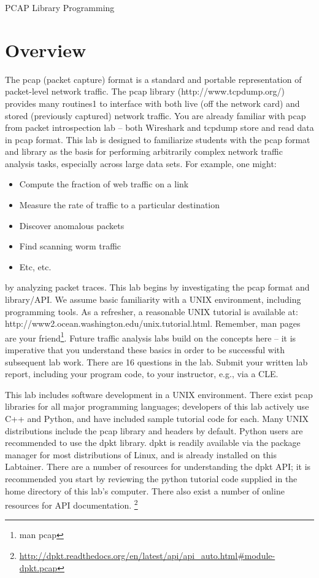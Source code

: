 


\begin{center}
{\LARGE PCAP Library Programming}
\vspace{0.1in}\\
\end{center}

\section{Overview}
The pcap (packet capture) format is a standard and portable representation of packet-level network traffic. The pcap library (http://www.tcpdump.org/) provides many routines1 to interface with both live (off the network card) and stored (previously captured) network traffic. You are already familiar with pcap from 
packet introspection lab – both Wireshark and tcpdump store and read data in pcap format.
This lab is designed to familiarize students with the pcap format and library as the basis for performing arbitrarily complex network traffic analysis tasks, especially across large data sets. For example, one might:
\begin{itemize}
\item Compute the fraction of web traffic on a link
\item Measure the rate of traffic to a particular destination 
\item Discover anomalous packets
\item Find scanning worm traffic
\item Etc, etc.
\end{itemize}
by analyzing packet traces. This lab begins by investigating the pcap format and library/API. We assume basic familiarity with a UNIX environment, including programming tools. As
a refresher, a reasonable UNIX tutorial is available at: http://www2.ocean.washington.edu/unix.tutorial.html.
Remember, man pages are your friend\footnote{man pcap}. Future traffic analysis labs build on the concepts here – it is imperative that you understand these basics in order to be successful with subsequent lab work.
There are 16 questions in the lab. Submit your written lab report, including your program code, to your instructor, e.g., via a CLE.
  
This lab includes software development in a UNIX environment.  There exist pcap libraries for all major programming languages; developers of this lab actively use C++ and Python, and have included sample tutorial code for each. Many UNIX distributions include the pcap library and headers by default. Python users are recommended to use the dpkt library. dpkt is readily available via the package manager for most distributions of Linux, and is already installed on this Labtainer. There are a number of resources for understanding the dpkt API; it is recommended you start by reviewing the python tutorial code supplied in the home directory of this lab's computer. 
There also exist a number of online resources for API documentation.  \footnote{\url{http://dpkt.readthedocs.org/en/latest/api/api\_auto.html\#module-dpkt.pcap}}

